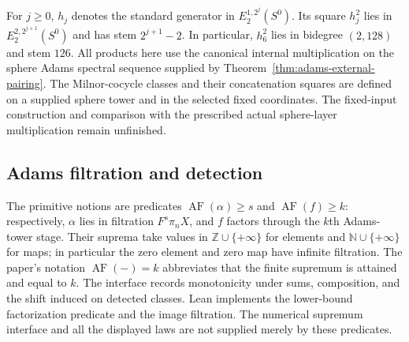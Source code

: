 \begin{definition}
  \label{def:adams-hj}
  \notready
  For $j\ge0$, $h_j$ denotes the standard generator in
  $E_2^{1,2^j}(S^0)$.  Its square $h_j^2$ lies in
  $E_2^{2,2^{j+1}}(S^0)$ and has stem $2^{j+1}-2$.  In particular,
  $h_6^2$ lies in bidegree $(2,128)$ and stem $126$.  All products here use
  the canonical internal multiplication on the sphere Adams spectral sequence
  supplied by Theorem~\ref{thm:adams-external-pairing}.
  The Milnor-cocycle classes and their concatenation squares are defined
  on a supplied sphere tower and in the selected fixed coordinates. The
  fixed-input construction and comparison with the prescribed actual
  sphere-layer multiplication remain unfinished.
\end{definition}

\subsection{Adams filtration and detection}

\begin{definition}
  \label{def:adams-filtration}
  \notready
  The primitive notions are predicates $\operatorname{AF}(\alpha)\ge s$ and
  $\operatorname{AF}(f)\ge k$: respectively, $\alpha$ lies in filtration
  $F^s\pi_nX$, and $f$ factors through the $k$th Adams-tower stage.  Their
  suprema take values in $\mathbb Z\cup\{+\infty\}$ for elements and
  $\mathbb N\cup\{+\infty\}$ for maps; in particular the zero element and zero
  map have infinite filtration.  The paper's notation
  $\operatorname{AF}(-)=k$ abbreviates that the finite supremum is attained
  and equal to $k$.  The interface records monotonicity under sums,
  composition, and the shift induced on detected classes.
  Lean implements the lower-bound factorization predicate and the image
  filtration. The numerical supremum interface and all the displayed laws
  are not supplied merely by these predicates.
\end{definition}

